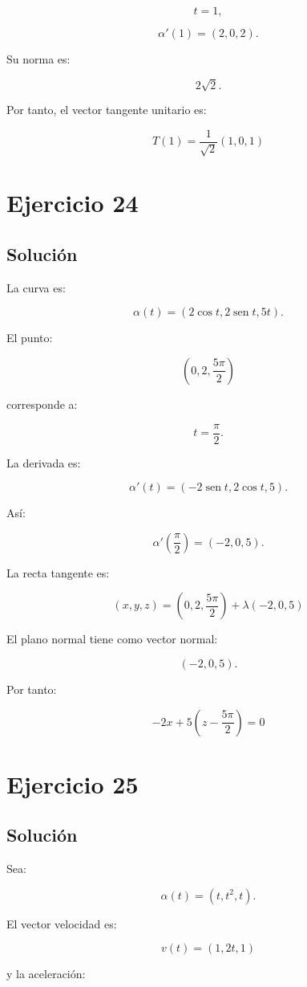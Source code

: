 \documentclass[11pt,a4paper]{article}
\newcommand{\sen}{\operatorname{sen}}
\begin{document}
\[
t=1,
\]

\[
\alpha'(1)
=
(2,0,2).
\]

Su norma es:

\[
2\sqrt2.
\]

Por tanto, el vector tangente unitario es:

\[
\boxed{
T(1)
=
\frac1{\sqrt2}(1,0,1)
}
\]

\section{Ejercicio 24}
\subsection{Solución}

La curva es:

\[
\alpha(t)
=
(2\cos t,2\sen t,5t).
\]

El punto:

\[
\left(
0,2,\frac{5\pi}{2}
\right)
\]

corresponde a:

\[
t=\frac{\pi}{2}.
\]

La derivada es:

\[
\alpha'(t)
=
(-2\sen t,2\cos t,5).
\]

Así:

\[
\alpha'\left(
\frac{\pi}{2}
\right)
=
(-2,0,5).
\]

La recta tangente es:

\[
\boxed{
(x,y,z)
=
\left(
0,2,\frac{5\pi}{2}
\right)
+
\lambda(-2,0,5)
}
\]

El plano normal tiene como vector normal:

\[
(-2,0,5).
\]

Por tanto:

\[
\boxed{
-2x
+
5\left(
z-\frac{5\pi}{2}
\right)
=
0
}
\]

\section{Ejercicio 25}
\subsection{Solución}

Sea:

\[
\alpha(t)
=
(t,t^2,t).
\]

El vector velocidad es:

\[
v(t)
=
(1,2t,1)
\]

y la aceleración:
\end{document}
